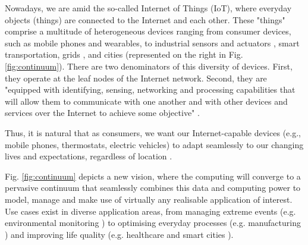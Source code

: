 Nowadays, we are amid the so-called Internet of Things (IoT), where everyday objects (things) are connected to the Internet and each other. These "things" comprise a multitude of heterogeneous devices ranging from consumer devices, such as mobile phones and wearables, to industrial sensors and actuators \cite{chen2018edge}, smart transportation, grids \cite{mugarza2019dynamic}, and cities \cite{mitton2012combining} (represented on the right in Fig. \ref{fig:continuum}). There are two denominators of this diversity of devices. First, they operate at the leaf nodes of the Internet network. Second, they are "equipped with identifying, sensing, networking and processing capabilities that will allow them to communicate with one another and with other devices and services over the Internet to achieve some objective" \cite{whitmore2015internet}.

Thus, it is natural that as consumers, we want our Internet-capable devices (e.g., mobile phones, thermostats, electric vehicles) to adapt seamlessly to our changing lives and expectations, regardless of location \cite{beckman2020harnessing}.


Fig. \ref{fig:continuum} depicts a new vision, where the computing will converge to a pervasive continuum that seamlessly combines this data and computing power to model, manage and make use of virtually any realisable application of interest. Use cases exist in diverse application areas, from managing extreme events (e.g. environmental monitoring \cite{brzoza2016embedded}) to optimising everyday processes (e.g. manufacturing \cite{chen2018edge}) and improving life quality (e.g. healthcare \cite{pace2018edge} and smart cities \cite{he2017multitier}).

